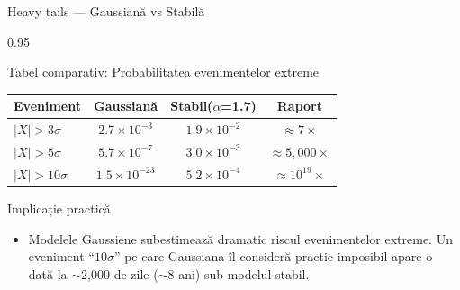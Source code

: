 \documentclass[9pt, aspectratio=169, t]{beamer}
\begin{document}
\begin{frame}{Heavy tails --- Gaussiană vs Stabilă}
    \begin{cminipage}{0.95\textwidth}

\begin{block}{Tabel comparativ: Probabilitatea evenimentelor extreme}
\renewcommand{\arraystretch}{1.3}
\begin{center}
\begin{tabular}{lccc}
\toprule
\textbf{Eveniment} & \textbf{Gaussiană} & \textbf{Stabil($\alpha$=1.7)} & \textbf{Raport} \\
\midrule
$|X| > 3\sigma$ & $2.7 \times 10^{-3}$ & $1.9 \times 10^{-2}$ & $\approx 7\times$ \\
$|X| > 5\sigma$ & $5.7 \times 10^{-7}$ & $3.0 \times 10^{-3}$ & $\approx 5{,}000\times$ \\
$|X| > 10\sigma$ & $1.5 \times 10^{-23}$ & $5.2 \times 10^{-4}$ & $\approx 10^{19}\times$ \\
\bottomrule
\end{tabular}
\end{center}
\end{block}

\begin{alertblock}{Implicație practică}
\begin{itemize}\setlength{\itemsep}{0pt}
    \item Modelele Gaussiene subestimează dramatic riscul evenimentelor extreme. Un eveniment ``$10\sigma$'' pe care Gaussiana îl consideră practic imposibil apare o dată la $\sim$2{,}000 de zile ($\sim$8 ani) sub modelul stabil.
\end{itemize}
\end{alertblock}
    \end{cminipage}
\end{frame}
\end{document}
